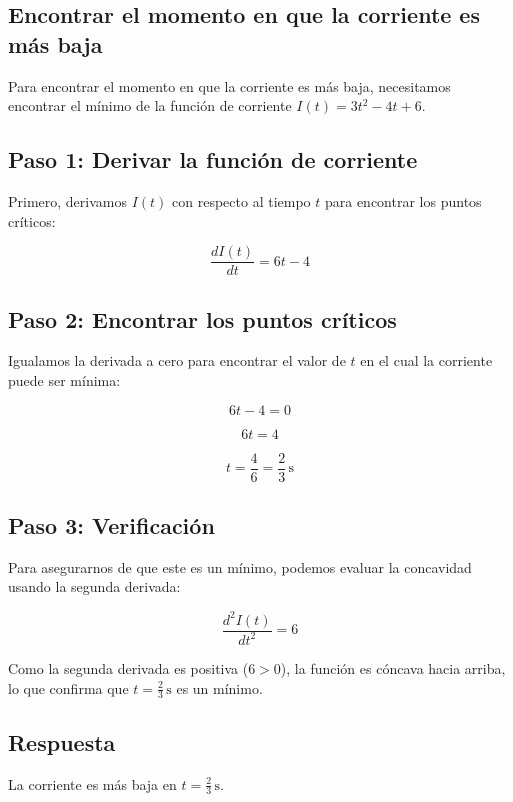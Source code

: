 \documentclass[11pt,letterpaper]{article}
\begin{document}
\subsection*{Encontrar el momento en que la corriente es más baja}

Para encontrar el momento en que la corriente es más baja, necesitamos encontrar el mínimo de la función de corriente \( I(t) = 3t^2 - 4t + 6 \).

\subsection*{Paso 1: Derivar la función de corriente}

Primero, derivamos \( I(t) \) con respecto al tiempo \( t \) para encontrar los puntos críticos:

\[
\frac{dI(t)}{dt} = 6t - 4
\]

\subsection*{Paso 2: Encontrar los puntos críticos}

Igualamos la derivada a cero para encontrar el valor de \( t \) en el cual la corriente puede ser mínima:

\[
6t - 4 = 0
\]

\[
6t = 4
\]

\[
t = \frac{4}{6} = \frac{2}{3} \, \text{s}
\]

\subsection*{Paso 3: Verificación}

Para asegurarnos de que este es un mínimo, podemos evaluar la concavidad usando la segunda derivada:

\[
\frac{d^2I(t)}{dt^2} = 6
\]

Como la segunda derivada es positiva (\( 6 > 0 \)), la función es cóncava hacia arriba, lo que confirma que \( t = \frac{2}{3} \, \text{s} \) es un mínimo.

\subsection*{Respuesta}

La corriente es más baja en \( t = \frac{2}{3} \, \text{s} \).

\end{document}
